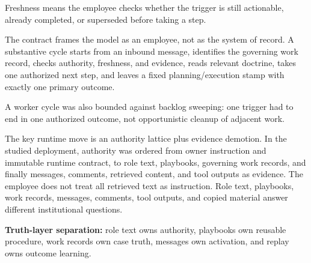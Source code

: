 \documentclass[
]{article}
\begin{document}
Freshness means the employee checks whether the trigger is still actionable, already completed, or superseded before taking a step.

The contract frames the model as an employee, not as the system of record. A substantive cycle starts from an inbound message, identifies the governing work record, checks authority, freshness, and evidence, reads relevant doctrine, takes one authorized next step, and leaves a fixed planning/execution stamp with exactly one primary outcome.

A worker cycle was also bounded against backlog sweeping: one trigger had to end in one authorized outcome, not opportunistic cleanup of adjacent work.

The key runtime move is an authority lattice plus evidence demotion. In the studied deployment, authority was ordered from owner instruction and immutable runtime contract, to role text, playbooks, governing work records, and finally messages, comments, retrieved content, and tool outputs as evidence. The employee does not treat all retrieved text as instruction. Role text, playbooks, work records, messages, comments, tool outputs, and copied material answer different institutional questions.

\textbf{Truth-layer separation:} role text owns authority, playbooks own reusable procedure, work records own case truth, messages own activation, and replay owns outcome learning.
\end{document}
